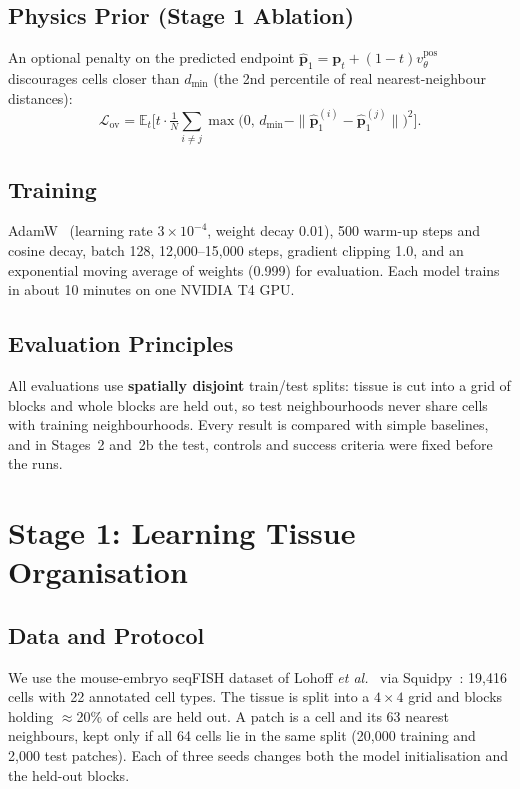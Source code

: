 \documentclass[journal]{IEEEtran}
\newcommand{\vtheta}{v_\theta}
\newcommand{\E}{\mathbb{E}}
\begin{document}
\subsection{Physics Prior (Stage 1 Ablation)}
An optional penalty on the predicted endpoint $\hat{\mathbf{p}}_1 = \mathbf{p}_t + (1-t)\vtheta^{\mathrm{pos}}$ discourages cells closer than $d_{\min}$ (the 2nd percentile of real nearest-neighbour distances):
\begin{equation}
\mathcal{L}_{\mathrm{ov}} = \E_t\Big[t\cdot\tfrac{1}{N}\textstyle\sum_{i\neq j}\max\big(0,\,d_{\min}-\|\hat{\mathbf{p}}_1^{(i)}-\hat{\mathbf{p}}_1^{(j)}\|\big)^2\Big].
\end{equation}

\subsection{Training}
AdamW~\cite{loshchilov2019} (learning rate $3\times10^{-4}$, weight decay 0.01), 500 warm-up steps and cosine decay, batch 128, 12{,}000--15{,}000 steps, gradient clipping 1.0, and an exponential moving average of weights (0.999) for evaluation. Each model trains in about 10 minutes on one NVIDIA T4 GPU.

\subsection{Evaluation Principles}
All evaluations use \textbf{spatially disjoint} train/test splits: tissue is cut into a grid of blocks and whole blocks are held out, so test neighbourhoods never share cells with training neighbourhoods. Every result is compared with simple baselines, and in Stages~2 and~2b the test, controls and success criteria were fixed before the runs.

\section{Stage 1: Learning Tissue Organisation}

\subsection{Data and Protocol}
We use the mouse-embryo seqFISH dataset of Lohoff \emph{et al.}~\cite{lohoff2022} via Squidpy~\cite{palla2022}: 19{,}416 cells with 22 annotated cell types. The tissue is split into a $4\times4$ grid and blocks holding $\approx$20\% of cells are held out. A patch is a cell and its 63 nearest neighbours, kept only if all 64 cells lie in the same split (20{,}000 training and 2{,}000 test patches). Each of three seeds changes both the model initialisation and the held-out blocks.
\end{document}
